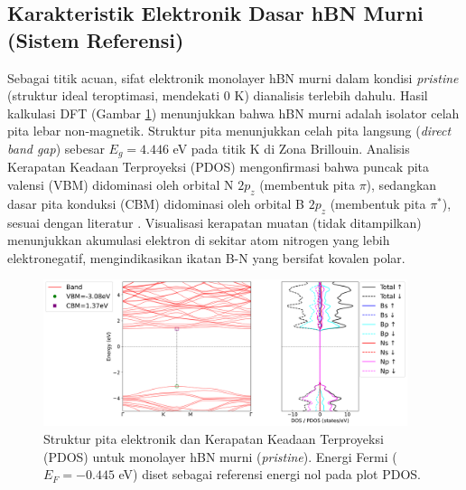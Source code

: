 \subsection{Karakteristik Elektronik Dasar hBN Murni (Sistem Referensi)}
\label{subsec:hbn_murni_dasar}
Sebagai titik acuan, sifat elektronik monolayer hBN murni dalam kondisi \emph{pristine} (struktur ideal teroptimasi, mendekati 0 K) dianalisis terlebih dahulu.
Hasil kalkulasi DFT (Gambar \ref{fig:hbn_pristine_bs_pdos}) menunjukkan bahwa hBN murni adalah isolator celah pita lebar non-magnetik.
Struktur pita menunjukkan celah pita langsung (\emph{direct band gap}) sebesar $E_g = 4.446$ eV pada titik K di Zona Brillouin.
Analisis Kerapatan Keadaan Terproyeksi (PDOS) mengonfirmasi bahwa puncak pita valensi (VBM) didominasi oleh orbital N $2p_z$ (membentuk pita $\pi$), sedangkan dasar pita konduksi (CBM) didominasi oleh orbital B $2p_z$ (membentuk pita $\pi^*$), sesuai dengan literatur \cite{Sachs2011}.
Visualisasi kerapatan muatan (tidak ditampilkan) menunjukkan akumulasi elektron di sekitar atom nitrogen yang lebih elektronegatif, mengindikasikan ikatan B-N yang bersifat kovalen polar.
\begin{figure}[htbp!] %
    \centering
    \includegraphics[width=0.95\textwidth]{gambar_hasil/simple_bands_pdos_pristine.png}
    \caption{Struktur pita elektronik dan Kerapatan Keadaan Terproyeksi (PDOS) untuk monolayer hBN murni (\emph{pristine}).
Energi Fermi ($E_F = -0.445$ eV) diset sebagai referensi energi nol pada plot PDOS.}
    \label{fig:hbn_pristine_bs_pdos}
\end{figure}

